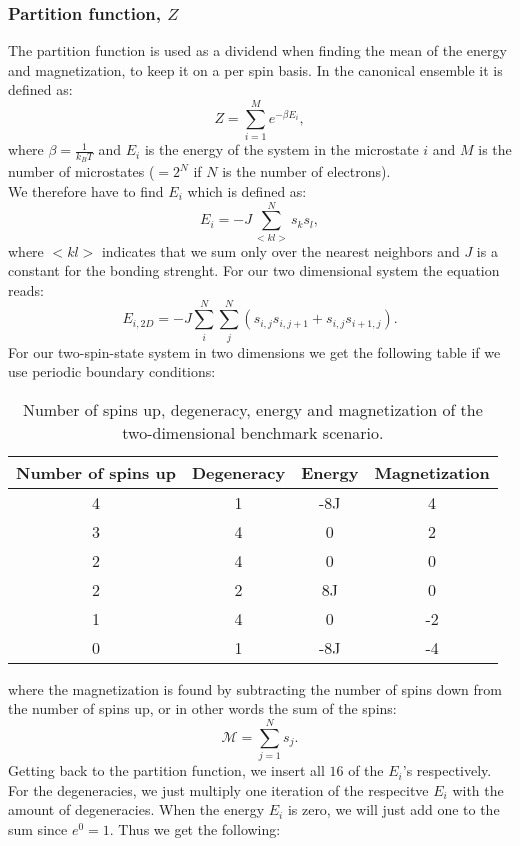 \documentclass[../main.tex]{subfiles}
\begin{document}
\subsubsection*{Partition function, $Z$}
The partition function is used as a dividend when finding the mean of the energy and magnetization, to keep it on a per spin basis. In the canonical ensemble it is defined as:
\[ Z = \sum_{i=1}^M e^{-\beta E_i},\]
where $\beta =\frac{1}{k_B T}$ and $E_i$ is the energy of the system in the microstate $i$ and $M$ is the number of microstates ($=2^N$ if $N$ is the number of electrons).
\\
We therefore have to find $E_i$ which is defined as:
\[E_i = -J \sum_{<kl>}^N s_k s_l,\]
where $<kl>$ indicates that we sum only over the nearest neighbors and $J$ is a constant for the bonding strenght. For our two dimensional system the equation reads:
\[E_{i,2D} = -J \sum_i^N \sum_j^N \left(s_{i,j}s_{i,j+1} + s_{i,j}s_{i+1,j}\right).\]
For our two-spin-state system in two dimensions we get the following table if we use periodic boundary conditions:
\begin{table}[!h]
  \begin{center}
    \begin{tabular}{| c | c | c | c |}
      \hline
      Number of spins up & Degeneracy & Energy & Magnetization\\
      \hline
      4 & 1 & -8J & 4\\
      3 & 4 & 0 & 2 \\
      2 & 4 & 0 & 0\\
      2 & 2 & 8J & 0 \\
      1 & 4 & 0 & -2 \\
      0 & 1 & -8J & -4 \\
      \hline
    \end{tabular}
    \caption{Number of spins up, degeneracy, energy and magnetization of the two-dimensional benchmark scenario.}
    \label{tab:2x2spinsEnergiesMags}
  \end{center}
\end{table}
\FloatBarrier
where the magnetization is found by subtracting the number of spins down from the number of spins up, or in other words the sum of the spins:
\[\mathcal{M} = \sum_{j=1}^N s_j.\]
Getting back to the partition function, we insert all $16$ of the $E_i$'s respectively. For the degeneracies, we just multiply one iteration of the respecitve $E_i$ with the amount of degeneracies. When the energy $E_i$ is zero, we will just add one to the sum since $e^0 = 1$. Thus we get the following:
\end{document}
